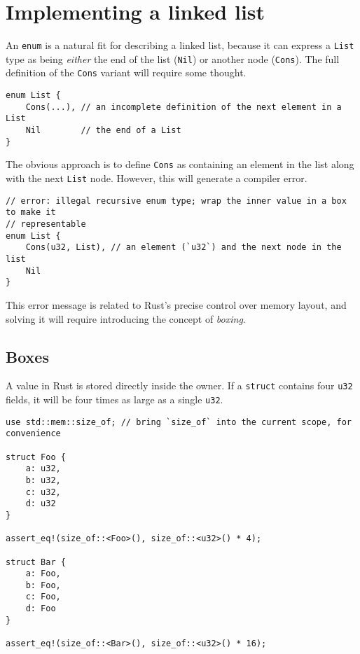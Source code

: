 \documentclass[]{article}
\begin{document}
\section{Implementing a linked list}\label{implementing-a-linked-list}

An \texttt{enum} is a natural fit for describing a linked list, because
it can express a \texttt{List} type as being \emph{either} the end of
the list (\texttt{Nil}) or another node (\texttt{Cons}). The full
definition of the \texttt{Cons} variant will require some thought.

\begin{verbatim}
enum List {
    Cons(...), // an incomplete definition of the next element in a List
    Nil        // the end of a List
}
\end{verbatim}

The obvious approach is to define \texttt{Cons} as containing an element
in the list along with the next \texttt{List} node. However, this will
generate a compiler error.

\begin{verbatim}
// error: illegal recursive enum type; wrap the inner value in a box to make it
// representable
enum List {
    Cons(u32, List), // an element (`u32`) and the next node in the list
    Nil
}
\end{verbatim}

This error message is related to Rust's precise control over memory
layout, and solving it will require introducing the concept of
\emph{boxing}.

\subsection{Boxes}\label{boxes}

A value in Rust is stored directly inside the owner. If a
\texttt{struct} contains four \texttt{u32} fields, it will be four times
as large as a single \texttt{u32}.

\begin{verbatim}
use std::mem::size_of; // bring `size_of` into the current scope, for convenience

struct Foo {
    a: u32,
    b: u32,
    c: u32,
    d: u32
}

assert_eq!(size_of::<Foo>(), size_of::<u32>() * 4);

struct Bar {
    a: Foo,
    b: Foo,
    c: Foo,
    d: Foo
}

assert_eq!(size_of::<Bar>(), size_of::<u32>() * 16);
\end{verbatim}
\end{document}
